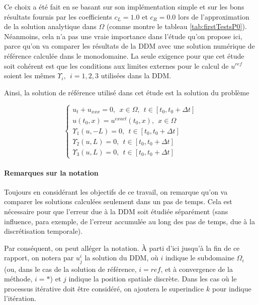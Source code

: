 \indent Ce choix a été fait en se basant sur son implémentation simple et sur les bons résultats fournis par les coefficients $c_L = 1.0$ et $c_R = 0.0$ lors de l'approximation de la solution analytique dans $\Omega$ (comme montre le tableau \ref{tab:firstTestsP0}). Néanmoins, cela n'a pas une vraie importance dans l'étude qu'on propose ici, parce qu'on va comparer les résultats de la DDM avec une solution numérique de référence calculée  dans le monodomaine. La seule exigence pour que cet étude soit cohérent est que les conditions aux limites externes pour le calcul de $u^{ref}$ soient les mêmes $\Upsilon_i, \ \ i=1,2,3$ utilisées dans la DDM.

\indent Ainsi, la solution de référence utilisé dans cet étude est la solution du problème

\begin{equation}
	\label{eq:problemMonodomain}
	\begin{cases}
	u_t + u_{xxx} = 0, \ \ x \in \Omega, \ \ t \in [t_0, t_0+\Delta t] \\
	u(t_0,x) = u^{exact}(t_0,x) , \ \ x \in \Omega \\ 
	\Upsilon_1(u,-L) = 0, \ \ t \in [t_0, t_0+\Delta t] \\
	\Upsilon_2(u,L) = 0, \ \ t \in [t_0, t_0+\Delta t] \\
	\Upsilon_3(u,L) = 0, \ \ t \in [t_0, t_0+\Delta t]
	\end{cases}
\end{equation}


\paragraph{Remarques sur la notation}

\indent Toujours en considérant les objectifs de ce travail, on remarque qu'on va comparer les solutions calculées seulement dans un pas de temps. Cela est nécessaire pour que l'erreur due à la DDM soit étudiée séparément (sans influence, para exemple, de l'erreur accumulée au long des pas de temps, due à la discrétisation temporale).

\indent Par conséquent, on peut alléger la notation. À parti d'ici jusqu'à la fin de ce rapport, on notera par $u_j^i$ la solution du DDM, où $i$ indique le subdomaine $\Omega_i$ (ou, dans le cas de la solution de référence, $i=ref$, et à convergence de la méthode, $i=*$) et $j$ indique la position spatiale discrète. Dans les cas où le processus itérative doit être considéré, on ajoutera le superindice $k$ pour indique l'itération.

